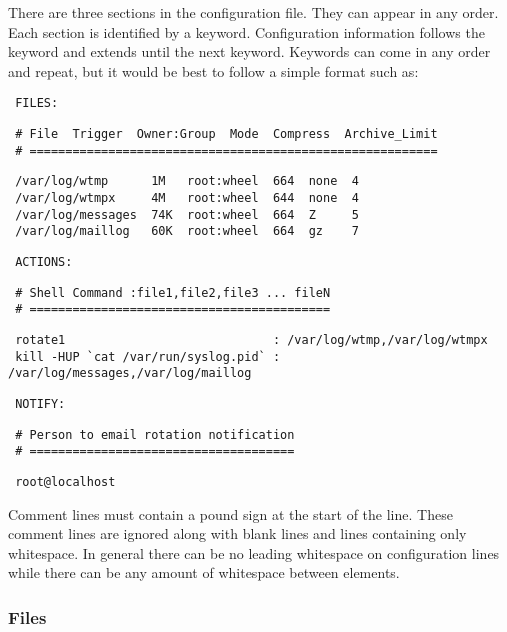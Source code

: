 \documentclass{article}
\begin{document}
There are three sections in the configuration file.  They can appear in
any order.  Each section is identified by a keyword.  Configuration
information follows the keyword and extends until the next keyword.
Keywords can come in any order and repeat, but it would be best to
follow a simple format such as:
\begin{verbatim}
 FILES:
\end{verbatim}
\begin{verbatim}
 # File  Trigger  Owner:Group  Mode  Compress  Archive_Limit
 # =========================================================
\end{verbatim}
\begin{verbatim}
 /var/log/wtmp      1M   root:wheel  664  none  4
 /var/log/wtmpx     4M   root:wheel  644  none  4
 /var/log/messages  74K  root:wheel  664  Z     5
 /var/log/maillog   60K  root:wheel  664  gz    7
\end{verbatim}
\begin{verbatim}
 ACTIONS:
\end{verbatim}
\begin{verbatim}
 # Shell Command :file1,file2,file3 ... fileN
 # ==========================================
\end{verbatim}
\begin{verbatim}
 rotate1                             : /var/log/wtmp,/var/log/wtmpx
 kill -HUP `cat /var/run/syslog.pid` : /var/log/messages,/var/log/maillog
\end{verbatim}
\begin{verbatim}
 NOTIFY:
\end{verbatim}
\begin{verbatim}
 # Person to email rotation notification
 # =====================================
\end{verbatim}
\begin{verbatim}
 root@localhost
\end{verbatim}

Comment lines must contain a pound sign at the start of the line.  These
comment lines are ignored along with blank lines and lines containing
only whitespace.  In general there can be no leading whitespace on
configuration lines while there can be any amount of whitespace between
elements.

\subsubsection*{Files}%
\end{document}
